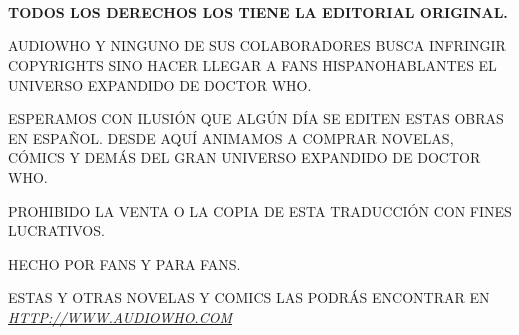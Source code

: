 \chapter*{}
~
\vfill
\begin{center}

\textbf{TODOS LOS DERECHOS LOS TIENE LA EDITORIAL ORIGINAL.}

\vspace{2mm}

AUDIOWHO Y NINGUNO DE SUS COLABORADORES BUSCA INFRINGIR COPYRIGHTS SINO HACER LLEGAR A FANS HISPANOHABLANTES EL UNIVERSO EXPANDIDO DE DOCTOR WHO.

\vspace{2mm}

ESPERAMOS CON ILUSIÓN QUE ALGÚN DÍA SE EDITEN ESTAS OBRAS EN ESPAÑOL. DESDE AQUÍ ANIMAMOS A COMPRAR NOVELAS, CÓMICS Y DEMÁS DEL GRAN UNIVERSO EXPANDIDO DE DOCTOR WHO.

\vspace{2mm}

PROHIBIDO LA VENTA O LA COPIA DE ESTA TRADUCCIÓN CON FINES LUCRATIVOS.

\vspace{2mm}

HECHO POR FANS Y PARA FANS.

\vspace{2mm}

ESTAS Y OTRAS NOVELAS Y COMICS LAS PODRÁS ENCONTRAR EN  \href{http://www.audiowho.com}{\textit{HTTP://WWW.AUDIOWHO.COM}}
\end{center}